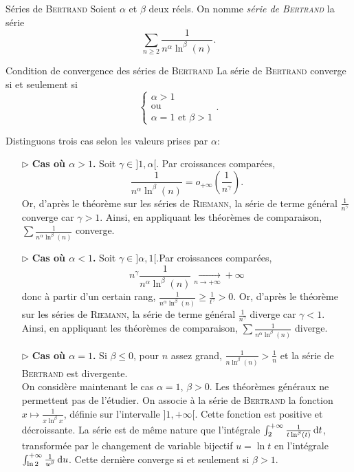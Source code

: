 
\begin{defi}{Séries de \textsc{Bertrand}}
    Soient $\alpha$ et $\beta$ deux réels. On nomme \emph{série de \textsc{Bertrand}} la série 
    $$\sum_{n \geqslant 2} \frac{1}{n^\alpha \ln^\beta (n)}.$$ 
\end{defi}

\begin{theo}{Condition de convergence des séries de \textsc{Bertrand}}
    La série de \textsc{Bertrand} converge si et seulement si 
    $$\begin{cases} \alpha > 1 \\
    \text{ou} \\ \alpha = 1 \text{ et } \beta > 1 \end{cases}.$$
\end{theo}

\begin{preuve}
    Distinguons trois cas selon les valeurs prises par $\alpha$:
    \begin{enumerate}
        \item[$\rhd$] \textbf{Cas où $\alpha > 1$.} Soit $\gamma \in ]1, \alpha[$. Par croissances comparées,
        $$\frac{1}{n^{\alpha} \ln^{\beta} (n)} = o_{+ \infty} \left( \frac{1}{n^{\gamma}} \right).$$
        Or, d'après le théorème sur les séries de \textsc{Riemann}, la série de terme général $\frac{1}{n^\gamma}$ converge car $\gamma > 1$. Ainsi, en appliquant les théorèmes de comparaison, $\sum \frac{1}{n^\alpha \ln^\beta (n)}$ converge.
        \item[$\rhd$] \textbf{Cas où $\alpha < 1$.} Soit $\gamma \in ]\alpha, 1[$.Par croissances comparées,
        $$n^{\gamma} \frac{1}{n^\alpha \ln^\beta(n)} \xrightarrow[n \to + \infty]{} + \infty$$
        donc à partir d'un certain rang, $\frac{1}{n^\alpha \ln^\beta(n)} \geqslant \frac{1}{t^{\gamma}} > 0$. Or, d'après le théorème sur les séries de \textsc{Riemann}, la série de terme général $\frac{1}{n^\gamma}$ diverge car $\gamma < 1$. Ainsi, en appliquant les théorèmes de comparaison, $\sum \frac{1}{n^\alpha \ln^\beta(n)}$ diverge.
        \item[$\rhd$] \textbf{Cas où $\alpha = 1$.} Si $\beta \leqslant 0$, pour $n$ assez grand, $\frac{1}{n \ln^\beta(n)} > \frac{1}{n}$ et la série de \textsc{Bertrand} est divergente. \\
        On considère maintenant le cas $\alpha = 1$, $\beta > 0$. Les théorèmes généraux ne permettent pas de l'étudier. On associe à la série de \textsc{Bertrand} la fonction $x \mapsto \frac{1}{x \ln^\beta x}$, définie sur l'intervalle $]1, + \infty[$. Cette fonction est positive et décroissante. La série est de même nature que l'intégrale $\int_2^{+ \infty} \frac{1}{t \ln^\beta(t)} \, \mathrm{d} t$, transformée par le changement de variable bijectif $u = \ln t$ en l'intégrale $\int_{\ln 2}^{+ \infty} \frac{1}{u^\beta} \, \mathrm{d} u$. Cette dernière converge si et seulement si $\beta > 1$.
    \end{enumerate}
\end{preuve}

